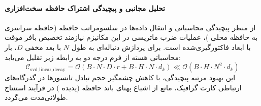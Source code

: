\paragraph{تحلیل مجانبی و پیچیدگی اشتراک حافظه سخت‌افزاری}
از منظر پیچیدگی محاسباتی و انتقال داده‌ها در سلسومراتب حافظه (حافظه سراسری  به حافظه محلی )، عملیات ضرب ماتریسی در این مکانیزم نیازمند تخصیص بافر موقت با ابعاد فاکتورگیری‌شده است. برای پردازش دنباله‌ای به طول $N$ با بعد مخفی $D$، بار محاسباتی هسته از فرم درجه دو به رابطه زیر تقلیل می‌یابد:
\begin{equation}
\label{eq:complexity_svd_linear_decay}
\mathcal{C}_{\text{svd\_linear\_decay}} = \mathcal{O}\left( B \cdot N \cdot D \cdot r + B \cdot H \cdot N \cdot d_k \right) \ll \mathcal{O}\left( B \cdot H \cdot N^2 \cdot d_k \right)
\end{equation}
این بهبود مرتبه پیچیدگی، با کاهش چشمگیر حجم تبادل تانسورها در گذرگاه‌های ارتباطی کارت گرافیک، مانع از اشباع پهنای باند حافظه (پدیده ) در فرآیند استنتاج طولانی‌مدت می‌گردد.
